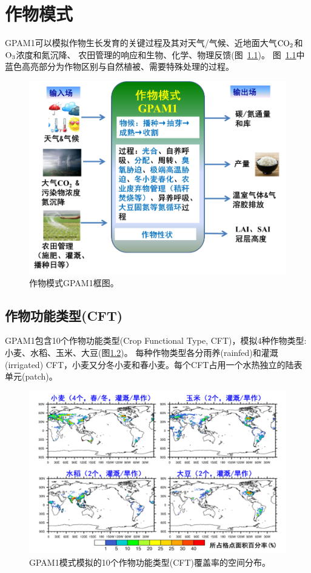 \chapter{作物模式}

GPAM1可以模拟作物生长发育的关键过程及其对天气/气候、近地面大气$\rm CO_2$和$\rm O_3$浓度和氮沉降、
农田管理的响应和生物、化学、物理反馈(图~\ref{fig:作物模式GPAM1框图})。
图~\ref{fig:作物模式GPAM1框图}中蓝色高亮部分为作物区别与自然植被、需要特殊处理的过程。
{
\begin{figure}[]
\centering
\includegraphics{Figures/作物模式/作物模式GPAM1框图.png}
\caption{作物模式GPAM1框图。  }
\label{fig:作物模式GPAM1框图}
\end{figure}
}
\section{作物功能类型(CFT)}
GPAM1包含10个作物功能类型(Crop Functional Type, CFT)，模拟4种作物类型: 小麦、水稻、玉米、大豆(图\ref{fig:作物功能类型覆盖率的空间分布})。
每种作物类型各分雨养(rainfed)和灌溉(irrigated) CFT，小麦又分冬小麦和春小麦。每个CFT占用一个水热独立的陆表单元(patch)。
{
\begin{figure}[]
\centering
\includegraphics{Figures/作物模式/作物功能类型覆盖率的空间分布.png}
\caption{GPAM1模式模拟的10个作物功能类型(CFT)覆盖率的空间分布。}
\label{fig:作物功能类型覆盖率的空间分布}
\end{figure}
}
